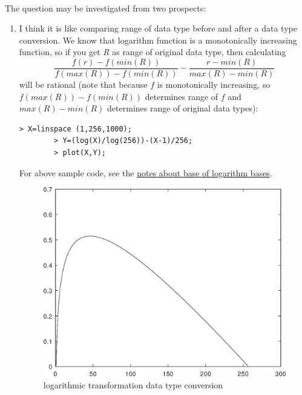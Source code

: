 \paragraph{}The question may be investigated from two prospects:
\begin{enumerate}
    \item I think it is like comparing range of data type before and after a
    data type conversion. We know that logarithm function 
    is a monotonically increasing function, so if you get \emph{R} as range of
    original data type, then calculating 
    \begin{equation*}
        \frac{f(r) - f(min(R))}{f(max(R))-f(min(R))} - \frac{r -
        min(R)}{max(R)-min(R)}  \tag{*}
    \end{equation*}\label{relation:eq_1} 
    will be rational (note that because $f$ is monotonically increasing, so $f(max(R))-f(min(R))$ determines range of $f$ and 
    $max(R)-min(R)$ determines range of original data types):
    \begin{Verbatim}[frame=single,label=Octave lab:\ logarithmic-data-type-conversion]
        > X=linspace (1,256,1000);
        > Y=(log(X)/log(256))-(X-1)/256;
        > plot(X,Y);   
    \end{Verbatim}
    For above sample code, see the \hyperref[note:note_about_log_base]{notes
    about base of logarithm bases}.
    \begin{figure}[htb!]
        \includegraphics[scale=0.4]{logarithmic_transformation_data_type_conversion.eps}
        \centering
        \caption{logarithmic transformation data type conversion}
        \label{fig:logarithmic_transformation_data_type_conversion}
    \end{figure}
    

\end{enumerate}
